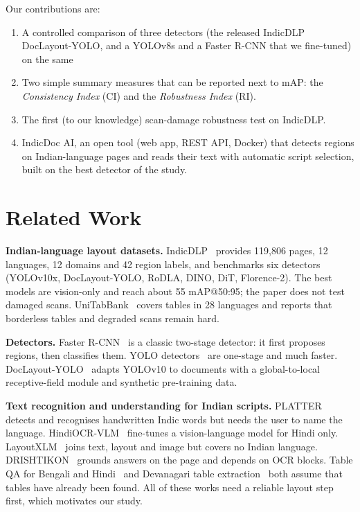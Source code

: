 \noindent Our contributions are:
\begin{enumerate}
\item A controlled comparison of three detectors (the released IndicDLP DocLayout-YOLO, and a YOLOv8s and a Faster
R-CNN that we fine-tuned) on the same %
\item Two simple summary measures that can be reported next to mAP: the \emph{Consistency Index} (CI) and the
\emph{Robustness Index} (RI).
\item The first (to our knowledge) scan-damage robustness test on IndicDLP.
\item IndicDoc AI, an open tool (web app, REST API, Docker) that detects regions on Indian-language pages and reads
their text with automatic script selection, built on the best detector of the study.
\end{enumerate}

\section{Related Work}
\textbf{Indian-language layout datasets.} IndicDLP~\cite{indicdlp} provides 119{,}806 pages, 12 languages, 12
domains and 42 region labels, and benchmarks six detectors (YOLOv10x, DocLayout-YOLO, RoDLA, DINO, DiT,
Florence-2). The best models are vision-only and reach about 55 mAP@50:95; the paper does not test damaged scans.
UniTabBank~\cite{unitabbank} covers tables in 28 languages and reports that borderless tables and degraded scans
remain hard.

\textbf{Detectors.} Faster R-CNN~\cite{fasterrcnn} is a classic two-stage detector: it first proposes regions,
then classifies them. YOLO detectors~\cite{yolov8} are one-stage and much faster. DocLayout-YOLO~\cite{doclayout}
adapts YOLOv10 to documents with a global-to-local receptive-field module and synthetic pre-training data.

\textbf{Text recognition and understanding for Indian scripts.} PLATTER~\cite{platter} detects and recognises
handwritten Indic words but needs the user to name the language. HindiOCR-VLM~\cite{hindiocr} fine-tunes a
vision-language model for Hindi only. LayoutXLM~\cite{layoutxlm} joins text, layout and image but covers no Indian
language. DRISHTIKON~\cite{drishtikon} grounds answers on the page and depends on OCR blocks. Table QA for Bengali
and Hindi~\cite{tableqa} and Devanagari table extraction~\cite{devtables} both assume that tables have already
been found. All of these works need a reliable layout step first, which motivates our study.

